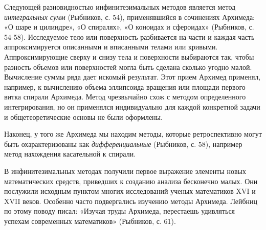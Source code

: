 Следующей разновидностью инфинитезимальных методов является метод
\emph{интегральных сумм} (Рыбников, с. 54), применявшийся в сочинениях
Архимеда: «О шаре и цилиндре», «О спиралях», «О коноидах и сфероидах»
(Рыбников, с. 54-58). Исследуемое тело или поверхность разбивается на
части и каждая часть аппроксимируется описанными и вписанными телами
или кривыми. Аппроксимирующие сверху и снизу тела и поверхности
выбираются так, чтобы разность объемов или поверхностей могла быть
сделана сколько угодно малой. Вычисление суммы ряда дает искомый
результат. Этот прием Архимед применял, например, к вычислению объема
эллипсоида вращения или площади первого витка спирали Архимеда. Метод
чрезвычайно схож с методом определенного интегрирования, но он
применялся индивидуально для каждой конкретной задачи и
общетеоретические основы не были оформлены.

Наконец, у того же Архимеда мы находим методы, которые ретроспективно
могут быть охарактеризованы как \emph{дифференциальные} (Рыбников, с.
58), например метод нахождения касательной к спирали.

В инфинитезимальных методах получили первое выражение элементы новых
математических средств, приведших к созданию анализа бесконечно малых.
Они послужили исходным пунктом многих исследований ученых математиков
XVI и XVII веков. Особенно часто подвергались изучению методы
Архимеда. Лейбниц по этому поводу писал: «Изучая труды Архимеда,
перестаешь удивляться успехам современных математиков» (Рыбников, с.
61).


